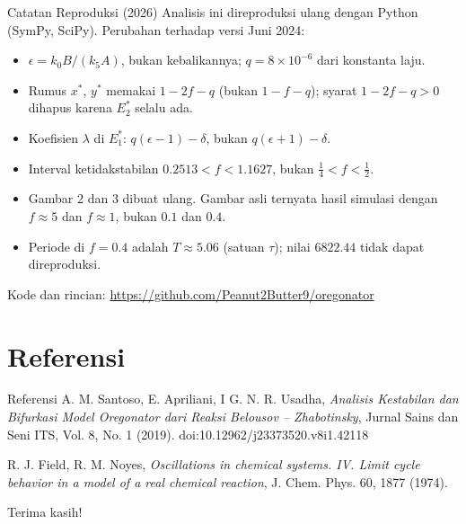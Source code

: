 \documentclass[aspectratio=169]{beamer}
\begin{document}
\begin{frame}{Catatan Reproduksi (2026)}
    \small
    Analisis ini direproduksi ulang dengan Python (SymPy, SciPy).
    Perubahan terhadap versi Juni 2024:
    \begin{itemize}
        \item $\epsilon = k_0B/(k_5A)$, bukan kebalikannya; $q = 8\times10^{-6}$ dari konstanta laju.
        \item Rumus $x^*$, $y^*$ memakai $1-2f-q$ (bukan $1-f-q$); syarat $1-2f-q>0$ dihapus karena $E_2^*$ selalu ada.
        \item Koefisien $\lambda$ di $E_1^*$: $q(\epsilon-1)-\delta$, bukan $q(\epsilon+1)-\delta$.
        \item Interval ketidakstabilan $0.2513 < f < 1.1627$, bukan $\tfrac14 < f < \tfrac12$.
        \item Gambar 2 dan 3 dibuat ulang. Gambar asli ternyata hasil simulasi dengan $f \approx 5$ dan $f \approx 1$, bukan $0.1$ dan $0.4$.
        \item Periode di $f = 0.4$ adalah $T \approx 5.06$ (satuan $\tau$); nilai $6822.44$ tidak dapat direproduksi.
    \end{itemize}
    Kode dan rincian: \url{https://github.com/Peanut2Butter9/oregonator}
\end{frame}

\section{Referensi}

\begin{frame}{Referensi}
    \small
    A. M. Santoso, E. Apriliani, I G. N. R. Usadha, \emph{Analisis Kestabilan dan Bifurkasi Model Oregonator dari Reaksi Belousov – Zhabotinsky}, Jurnal Sains dan Seni ITS, Vol. 8, No. 1 (2019). doi:10.12962/j23373520.v8i1.42118

    \medskip
    R. J. Field, R. M. Noyes, \emph{Oscillations in chemical systems. IV. Limit cycle behavior in a model of a real chemical reaction}, J. Chem. Phys. 60, 1877 (1974).
\end{frame}

\begin{frame}
    \begin{center}
        {\Huge\calligra Terima kasih!}
    \end{center}
\end{frame}
\end{document}
